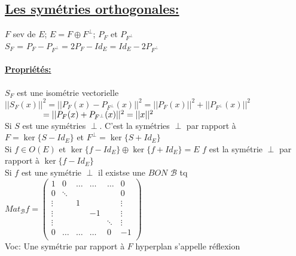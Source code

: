 \documentclass{article}
\newcommand\tab[1][1cm]{\hspace*{#1}}
\begin{document}
\subsection{\underline{Les symétries orthogonales:}}

$F$ sev de $E$; $E = F \oplus F^\perp$; $P_F$ et $P_{F^\perp}$\\
$S_F$ = $P_F - P_{F^\perp} = 2P_F - Id_E = Id_E - 2P_{F^\perp}$

\paragraph{\underline{Propriétés:}} $S_F$ est une isométrie vectorielle\\
$||S_F(x)||^2 = ||P_F(x) - P_{F^\perp}(x)||^2 = ||P_F(x)||^2 + ||P_{F^\perp}(x)||^2$\\
$\tab[1.6cm] = ||P_F(x) + P_{F^\perp}(x)||^2 = ||x||^2$\\
Si $S$ est une symétries $\perp$. C'est la symétries $\perp$ par rapport à $F = \ker\{S - Id_E\}$ et $F^\perp = \ker\{S + Id_E\}$\\
Si $f \in O(E)$ et $\ker\{f - Id_E\} \oplus \ker\{f + Id_E\} = E$ $f$ est la symétrie $\perp$ par rapport à $\ker \{f - Id_E\}$\\
Si $f$ est une symétrie $\perp$ il existse une $BON$ $\mathcal{B}$ tq\\
$Mat_{\mathcal{B}}f = \begin{pmatrix}
    1 & 0 & \dots & \dots & \dots & 0\\
    0 & \ddots & & & & 0\\
    \vdots & & 1 & & & \vdots\\
    \vdots & & & -1 & & \vdots\\
    \vdots & & & & \ddots & \vdots\\
    0 & \dots & \dots & \dots & 0 & -1\\
\end{pmatrix}$ \vspace{3mm}\\
Voc: Une symétrie par rapport à $F$ hyperplan s'appelle réflexion   
\end{document}
